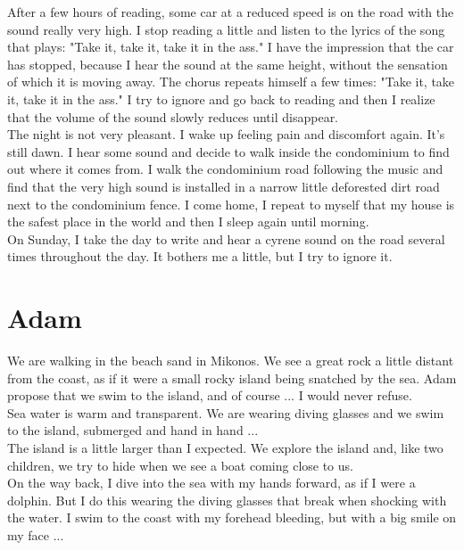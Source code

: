 \documentclass[11pt]{book}
\begin{document}
\noindent After a few hours of reading, some car at a reduced speed is on the road with the sound really very high. I stop reading a little and listen to the lyrics of the song that plays: "Take it, take it, take it in the ass." I have the impression that the car has stopped, because I hear the sound at the same height, without the sensation of which it is moving away. The chorus repeats himself a few times: "Take it, take it, take it in the ass." I try to ignore and go back to reading and then I realize that the volume of the sound slowly reduces until disappear. \\

\noindent The night is not very pleasant. I wake up feeling pain and discomfort again. It's still dawn. I hear some sound and decide to walk inside the condominium to find out where it comes from. I walk the condominium road following the music and find that the very high sound is installed in a narrow little deforested dirt road next to the condominium fence. I come home, I repeat to myself that my house is the safest place in the world and then I sleep again until morning. \\

\noindent On Sunday, I take the day to write and hear a cyrene sound on the road several times throughout the day. It bothers me a little, but I try to ignore it.

\chapter{Adam}

\noindent We are walking in the beach sand in Mikonos. We see a great rock a little distant from the coast, as if it were a small rocky island being snatched by the sea. Adam propose that we swim to the island, and of course ... I would never refuse. \\

\noindent Sea water is warm and transparent. We are wearing diving glasses and we swim to the island, submerged and hand in hand ... \\

\noindent The island is a little larger than I expected. We explore the island and, like two children, we try to hide when we see a boat coming close to us. \\

\noindent On the way back, I dive into the sea with my hands forward, as if I were a dolphin. But I do this wearing the diving glasses that break when shocking with the water. I swim to the coast with my forehead bleeding, but with a big smile on my face ... \\
\end{document}

